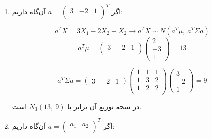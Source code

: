 
\begin{enumerate}
	\item 

	اگر 
	$
	a = \begin{pmatrix}
	3 & -2 & 1 \\
	\end{pmatrix}^T
	$
	آن‌گاه داریم: 
	
	$$a^TX=3X_1 -2X_2 + X_2
	\rightarrow a^TX \sim N(a^T\mu, \: a^T\Sigma a)
	$$
	$$a^T\mu = 
	\begin{pmatrix}
	3 & -2 & 1 \\
	\end{pmatrix}
	\begin{pmatrix}
	2 \\
	-3 \\
	1
	\end{pmatrix}
	= 13
	$$
	
	$$a^T\Sigma a = 
	\begin{pmatrix}
	3 & -2 & 1 
	\end{pmatrix}
	\begin{pmatrix}
	1 & 1 & 1 \\
	1 & 3 & 2 \\
	1 & 2 & 2 \\
	\end{pmatrix}
	\begin{pmatrix}
	3 \\
	-2 \\
	1
	\end{pmatrix}
	= 9
	$$
	
	در نتیجه‌ توزیع آن برابر با $N_3(13, \: 9)$ است.
	\item 
	اگر 
	$a = \begin{pmatrix}
	a_1 & a_2 \\
	\end{pmatrix}^T$ آن‌گاه داریم:
	

\end{enumerate}
